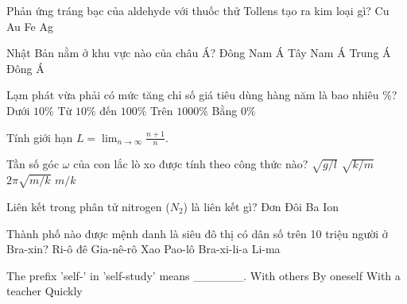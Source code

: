 \begin{ex}
    Phản ứng tráng bạc của aldehyde với thuốc thử Tollens tạo ra kim loại gì?
    \choice
    {Cu}
    {Au}
    {Fe}
    {\True Ag}
\end{ex}
\begin{ex}
    Nhật Bản nằm ở khu vực nào của châu Á?
    \choice
    {Đông Nam Á}
    {Tây Nam Á}
    {Trung Á}
    {\True Đông Á}
\end{ex}
\begin{ex}
    Lạm phát vừa phải có mức tăng chỉ số giá tiêu dùng hàng năm là bao nhiêu \%?
    \choice
    {\True Dưới $10\%$}
    {Từ $10\%$ đến $100\%$}
    {Trên $1000\%$}
    {Bằng $0\%$}
\end{ex}
\begin{ex}
    Tính giới hạn $L = \lim_{n \to \infty} \frac{n+1}{n}$.
\end{ex}
\begin{ex}
    Tần số góc $\omega$ của con lắc lò xo được tính theo công thức nào?
    \choice
    {$\sqrt{g/l}$}
    {\True $\sqrt{k/m}$}
    {$2\pi \sqrt{m/k}$}
    {$m/k$}
\end{ex}
\begin{ex}
    Liên kết trong phân tử nitrogen ($N_2$) là liên kết gì?
    \choice
    {Đơn}
    {Đôi}
    {\True Ba}
    {Ion}
\end{ex}
\begin{ex}
    Thành phố nào được mệnh danh là siêu đô thị có dân số trên 10 triệu người ở Bra-xin?
    \choice
    {Ri-ô đê Gia-nê-rô}
    {\True Xao Pao-lô}
    {Bra-xi-li-a}
    {Li-ma}
\end{ex}
\begin{ex}
    The prefix 'self-' in 'self-study' means ______.
    \choice
    {With others}
    {\True By oneself}
    {With a teacher}
    {Quickly}
\end{ex}
